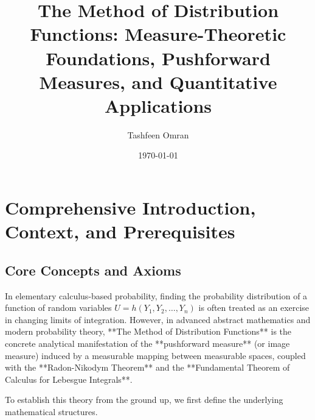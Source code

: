 \documentclass[11pt, letterpaper]{article}
\title{\textbf{The Method of Distribution Functions: Measure-Theoretic Foundations, Pushforward Measures, and Quantitative Applications}}
\author{Tashfeen Omran}
\date{\today}
\theoremstyle{definition}
\theoremstyle{remark}
\begin{document}
\maketitle
\tableofcontents
\newpage

\section{Comprehensive Introduction, Context, and Prerequisites}

\subsection{Core Concepts and Axioms}

In elementary calculus-based probability, finding the probability distribution of a function of random variables $U = h(Y_1, Y_2, \dots, Y_n)$ is often treated as an exercise in changing limits of integration. However, in advanced abstract mathematics and modern probability theory, **The Method of Distribution Functions** is the concrete analytical manifestation of the **pushforward measure** (or image measure) induced by a measurable mapping between measurable spaces, coupled with the **Radon-Nikodym Theorem** and the **Fundamental Theorem of Calculus for Lebesgue Integrals**.

To establish this theory from the ground up, we first define the underlying mathematical structures.
\end{document}
